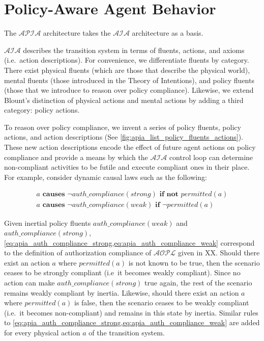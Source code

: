 \section{Policy-Aware Agent Behavior}

The $\mathcal{APIA}$ architecture takes the $\mathcal{AIA}$ architecture as a basis.

$\mathcal{AIA}$ describes the transition system in terms of fluents, actions, and axioms (i.e.~action descriptions).
For convenience, we differentiate fluents by category.
There exist physical fluents (which are those that describe the physical world), mental fluents (those introduced in the Theory of Intentions), and policy fluents (those that we introduce to reason over policy compliance).
Likewise, we extend Blount's distinction of physical actions and mental actions by adding a third category: policy actions.

To reason over policy compliance, we invent a series of policy fluents, policy actions, and action descriptions (See \cref{fig:apia_list_policy_fluents_actions}).
These new action descriptions encode the effect of future agent actions on policy compliance and provide a means by which the $\mathcal{AIA}$ control loop can determine non-compliant activities to be futile and execute compliant ones in their place.
For example, consider dynamic causal laws such as the following:

\begin{gather}
    a \textbf{ causes } \neg auth\_compliance(strong) \textbf{ if not } permitted(a)
        \label{eq:apia_auth_compliance_strong} \\
    a \textbf{ causes } \neg auth\_compliance(weak) \textbf{ if } \neg permitted(a)
        \label{eq:apia_auth_compliance_weak}
\end{gather}

Given inertial policy fluents $auth\_compliance(weak)$ and $auth\_compliance(strong)$, \cref{eq:apia_auth_compliance_strong,eq:apia_auth_compliance_weak} correspond to the definition of authorization compliance of $\mathcal{AOPL}$ given in XX.
Should there exist an action $a$ where $permitted(a)$ is not known to be true, then the scenario ceases to be strongly compliant (i.e~it becomes weakly compliant).
Since no action can make $auth\_compliance(strong)$ true again, the rest of the scenario remains weakly compliant by inertia.
Likewise, should there exist an action $a$ where $permitted(a)$ is false, then the scenario ceases to be weakly compliant (i.e.~it becomes non-compliant) and remains in this state by inertia.
Similar rules to \cref{eq:apia_auth_compliance_strong,eq:apia_auth_compliance_weak} are added for every physical action $a$ of the transition system.

